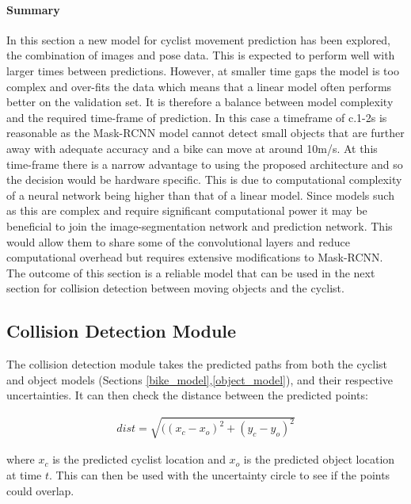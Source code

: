 \documentclass[11pt,twoside]{report}
\begin{document}
\paragraph{Summary}
In this section a new model for cyclist movement prediction has been explored, the combination of images and pose data. This is expected to perform well with larger times between predictions. However, at smaller time gaps the model is too complex and over-fits the data which means that a linear model often performs better on the validation set. It is therefore a balance between model complexity and the required time-frame of prediction. In this case a timeframe of c.1-2s is reasonable as the Mask-RCNN model cannot detect small objects that are further away with adequate accuracy and a bike can move at around 10m/s. At this time-frame there is a narrow advantage to using the proposed architecture and so the decision would be hardware specific. This is due to computational complexity of a neural network being higher than that of a linear model.
\newline \newline 
Since models such as this are complex and require significant computational power it may be beneficial to join the image-segmentation network and prediction network. This would allow them to share some of the convolutional layers and reduce computational overhead but requires extensive modifications to Mask-RCNN. The outcome of this section is a reliable model that can be used in the next section for collision detection between moving objects and the cyclist. 

\subsection{Collision Detection Module} \label{coll_det}
The collision detection module takes the predicted paths from both the cyclist and object models (Sections \ref{bike_model},\ref{object_model}), and their respective uncertainties. It can then check the distance between the predicted points:

\begin{equation}
\begin{aligned}
dist = \sqrt{( (x_{c}-x_{o})^{2} + (y_{c}-y_{o})^{2}}
\end{aligned}
\label{distance_eq}
\end{equation}

where $x_{c}$ is the predicted cyclist location and $x_{o}$ is the predicted object location at time $t$. This can then be used with the uncertainty circle to see if the points could overlap.
\end{document}
